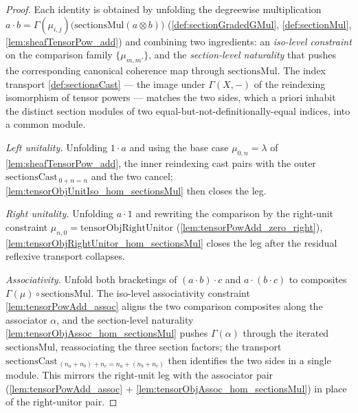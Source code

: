 \begin{proof}
  Each identity is obtained by unfolding the degreewise multiplication
  \(a \cdot b = \Gamma(\mu_{i,j})\bigl(\mathrm{sectionsMul}(a \otimes b)\bigr)\)
  (\cref{def:sectionGradedGMul}, \cref{def:sectionMul},
  \cref{lem:sheafTensorPow_add}) and combining two ingredients: an
  \emph{iso-level constraint} on the comparison family \(\{\mu_{m,m'}\}\), and the
  \emph{section-level naturality} that pushes the corresponding canonical coherence
  map through \(\mathrm{sectionsMul}\). The index transport \cref{def:sectionsCast}
  --- the image under \(\Gamma(X,-)\) of the reindexing isomorphism of tensor
  powers --- matches the two sides, which a priori inhabit the distinct section
  modules of two equal-but-not-definitionally-equal indices, into a common module.

  \emph{Left unitality.} Unfolding \(1 \cdot a\) and using the base case
  \(\mu_{0,n} = \lambda\) of \cref{lem:sheafTensorPow_add}, the inner reindexing
  cast pairs with the outer \(\mathrm{sectionsCast}_{\,0+n=n}\) and the two cancel;
  \cref{lem:tensorObjUnitIso_hom_sectionsMul} then closes the leg.

  \emph{Right unitality.} Unfolding \(a \cdot 1\) and rewriting the comparison by
  the right-unit constraint \(\mu_{n,0} = \mathrm{tensorObjRightUnitor}\)
  (\cref{lem:tensorPowAdd_zero_right}),
  \cref{lem:tensorObjRightUnitor_hom_sectionsMul} closes the leg after the residual
  reflexive transport collapses.

  \emph{Associativity.} Unfold both bracketings of \((a \cdot b) \cdot c\) and
  \(a \cdot (b \cdot c)\) to composites \(\Gamma(\mu) \circ \mathrm{sectionsMul}\).
  The iso-level associativity constraint \cref{lem:tensorPowAdd_assoc} aligns the
  two comparison composites along the associator \(\alpha\), and the section-level
  naturality \cref{lem:tensorObjAssoc_hom_sectionsMul} pushes \(\Gamma(\alpha)\)
  through the iterated \(\mathrm{sectionsMul}\), reassociating the three section
  factors; the transport
  \(\mathrm{sectionsCast}_{\,(n_a+n_b)+n_c = n_a+(n_b+n_c)}\) then identifies the
  two sides in a single module. This mirrors the right-unit leg with the associator
  pair (\cref{lem:tensorPowAdd_assoc} + \cref{lem:tensorObjAssoc_hom_sectionsMul})
  in place of the right-unitor pair.


\end{proof}
